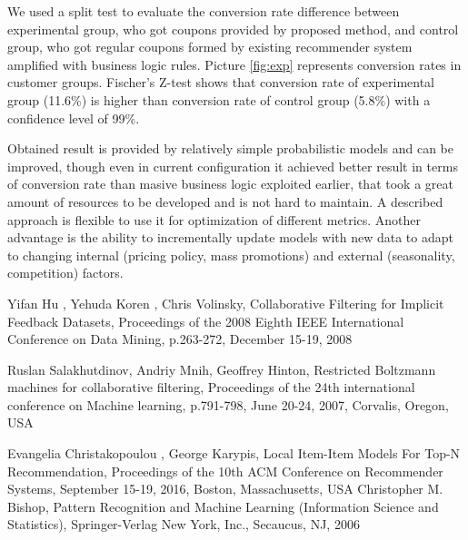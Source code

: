 \documentclass[12pt]{article}
\begin{document}
We used a split test to evaluate the conversion rate difference between experimental group, who got coupons provided by proposed method, and control group, who got regular coupons formed by existing recommender system amplified with business logic rules. Picture  \ref{fig:exp} represents conversion rates in customer groups. Fischer's Z-test shows that conversion rate of experimental group (11.6\%) is higher than conversion rate of control group (5.8\%) with a confidence level of 99\%. \par

Obtained result is provided by relatively simple probabilistic models and can be improved, though even in current configuration it achieved better result in terms of conversion rate than masive business logic exploited earlier, that took a great amount of resources to be developed and is not hard to maintain. A described approach is flexible to use it for optimization of different metrics. Another advantage is the ability to incrementally update models with new data to adapt to changing internal (pricing policy, mass promotions) and external (seasonality, competition) factors. \par

\begin{thebibliography}{99} %
\bibitem{}
Yifan Hu , Yehuda Koren , Chris Volinsky, Collaborative Filtering for Implicit Feedback Datasets, Proceedings of the 2008 Eighth IEEE International Conference on Data Mining, p.263-272, December 15-19, 2008

\bibitem{}
Ruslan Salakhutdinov, Andriy Mnih, Geoffrey Hinton, Restricted Boltzmann machines for collaborative filtering, Proceedings of the 24th international conference on Machine learning, p.791-798, June 20-24, 2007, Corvalis, Oregon, USA

\bibitem{}
Evangelia Christakopoulou , George Karypis, Local Item-Item Models For Top-N Recommendation, Proceedings of the 10th ACM Conference on Recommender Systems, September 15-19, 2016, Boston, Massachusetts, USA  
\bibitem{}
Christopher M. Bishop, Pattern Recognition and Machine Learning (Information Science and Statistics), Springer-Verlag New York, Inc., Secaucus, NJ, 2006

\end{thebibliography}
\end{document}
